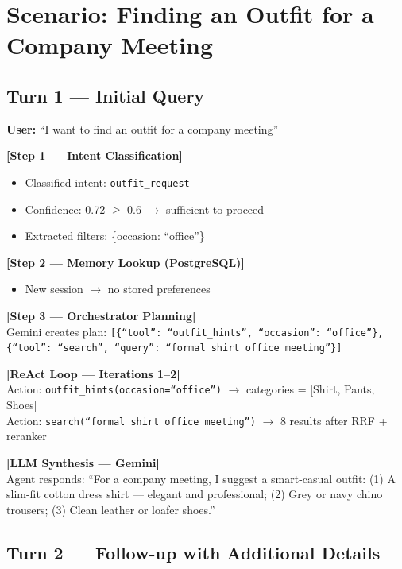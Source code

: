 \section{Scenario: Finding an Outfit for a Company Meeting}

\subsection{Turn 1 --- Initial Query}

\begin{tcolorbox}[title=Turn 1 Walkthrough]
\textbf{User:} ``I want to find an outfit for a company meeting''

\textbf{[Step 1 --- Intent Classification]}
\begin{itemize}
    \item Classified intent: \texttt{outfit\_request}
    \item Confidence: 0.72 $\geq$ 0.6 $\rightarrow$ sufficient to proceed
    \item Extracted filters: \{occasion: ``office''\}
\end{itemize}

\textbf{[Step 2 --- Memory Lookup (PostgreSQL)]}
\begin{itemize}
    \item New session $\rightarrow$ no stored preferences
\end{itemize}

\textbf{[Step 3 --- Orchestrator Planning]}\\
Gemini creates plan:
\texttt{[\{``tool'': ``outfit\_hints'', ``occasion'': ``office''\}, \{``tool'': ``search'', ``query'': ``formal shirt office meeting''\}]}

\textbf{[ReAct Loop --- Iterations 1--2]}\\
Action: \texttt{outfit\_hints(occasion=``office'')} $\rightarrow$ categories = [Shirt, Pants, Shoes]\\
Action: \texttt{search(``formal shirt office meeting'')} $\rightarrow$ 8 results after RRF + reranker

\textbf{[LLM Synthesis --- Gemini]}\\
Agent responds: ``For a company meeting, I suggest a smart-casual outfit: (1) A slim-fit cotton dress shirt --- elegant and professional; (2) Grey or navy chino trousers; (3) Clean leather or loafer shoes.''
\end{tcolorbox}

\subsection{Turn 2 --- Follow-up with Additional Details}

